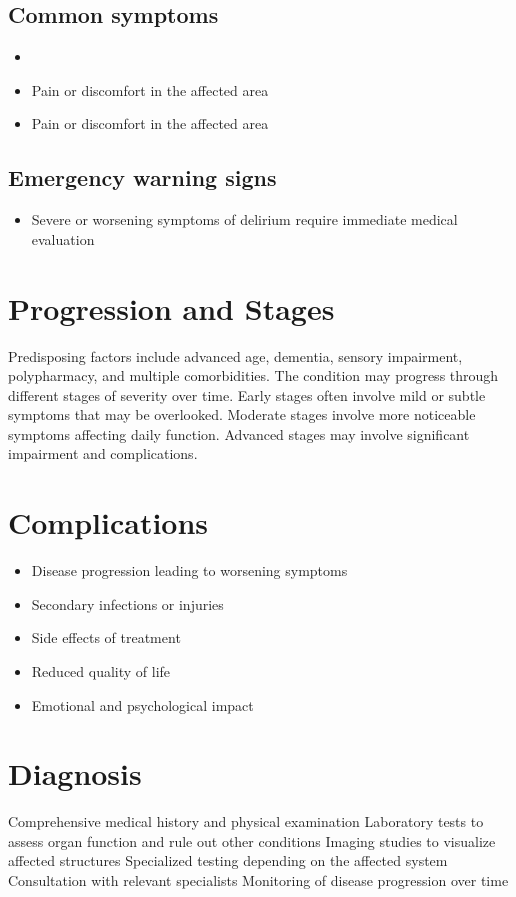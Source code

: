 \subsection{Common symptoms}
\begin{itemize}[noitemsep]
  \item \item Pain or discomfort in the affected area    \item Pain or discomfort in the affected area
  \end{itemize}

\subsection{Emergency warning signs}
\begin{itemize}[noitemsep]
  \item Severe or worsening symptoms of delirium require immediate medical evaluation
\end{itemize}
\section{Progression and Stages}
Predisposing factors include advanced age, dementia, sensory impairment, polypharmacy, and multiple comorbidities. The condition may progress through different stages of severity over time. Early stages often involve mild or subtle symptoms that may be overlooked. Moderate stages involve more noticeable symptoms affecting daily function. Advanced stages may involve significant impairment and complications.
\section{Complications}
\begin{itemize}[noitemsep]
  \item Disease progression leading to worsening symptoms
  \item Secondary infections or injuries
  \item Side effects of treatment
  \item Reduced quality of life
  \item Emotional and psychological impact
\end{itemize}
\section{Diagnosis}
Comprehensive medical history and physical examination Laboratory tests to assess organ function and rule out other conditions Imaging studies to visualize affected structures Specialized testing depending on the affected system Consultation with relevant specialists Monitoring of disease progression over time

